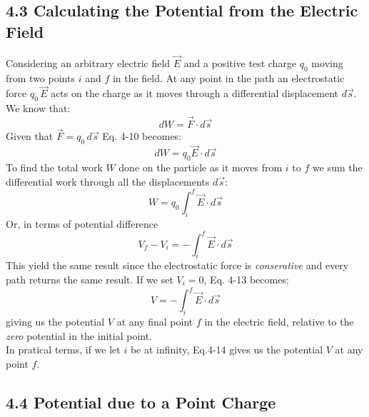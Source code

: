 \documentclass[12pt, a4paper]{article}
\begin{document}
		
		
		\subsection*{4.3 Calculating the Potential from the Electric Field}
		
		Considering an arbitrary electric field $\vec{E}$ and a positive test charge $q_0$ moving from two points $i$ and $f$ in the field. At any point in the path an electrostatic force $q_0 \, \vec{E}$ acts on the charge as it moves through a differential displacement $d\vec{s}$. We know that:
		\[
			dW = \vec{F} \cdot d\vec{s}
			\tag{4-10}
		\]
		Given that $\vec{F} = q_0 \, d\vec{s}$ Eq. 4-10 becomes:
		\[
			dW = q_0 \vec{E} \cdot d\vec{s}
			\tag{4-11}
		\]
		To find the total work $W$ done on the particle as it moves from $i$ to $f$ we sum the differential work through all the displacements $d\vec{s}$:
		\begin{equation*}
			W = q_0 \int_{i}^{f} \vec{E} \cdot d\vec{s}
			\tag{4-12}
		\end{equation*}
		Or, in terms of potential difference
		\begin{equation*}
			V_f - V_i = - \int_{i}^{f} \vec{E} \cdot d\vec{s}
			\tag{4-13}
		\end{equation*}
		This yield the same result since the electrostatic force is \textit{conserative} and every path returns the same result. If we set $V_i = 0$, Eq. 4-13 becomes:
		\begin{equation*}
			V = - \int_{i}^{f} \vec{E} \cdot d\vec{s}
			\tag{4-14}
		\end{equation*}
		giving us the potential $V$ at any final point $f$ in the electric field, relative to the \textit{zero} potential in the initial point. \\
		
		In pratical terms, if we let $i$ be at infinity, Eq.4-14 gives us the potential $V$ at any point $f$.
		
		
		
		\subsection*{4.4 Potential due to a Point Charge}
	
\end{document}
